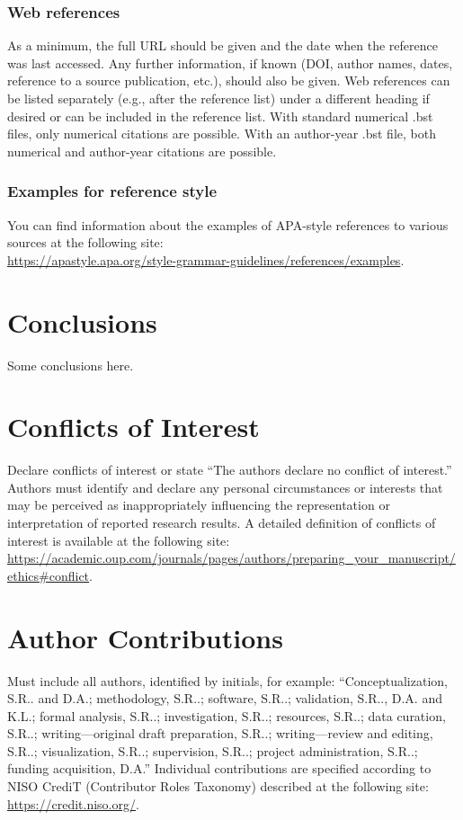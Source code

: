 \documentclass[12pt,a4paper]{article}
\begin{document}
\subsubsection{Web references}
As a minimum, the full URL should be given and the date when the reference was last accessed. Any further information, if known (DOI, author names, dates, reference to a source publication, etc.), should also be given. Web references can be listed separately (e.g., after the reference list) under a different heading if desired or can be included in the reference list. With standard numerical .bst files, only numerical citations are possible. With an author-year .bst file, both numerical and author-year citations are possible. 

\subsubsection{Examples for reference style}
You can find information about the examples of APA-style references to various sources at the following site:\\
\url{https://apastyle.apa.org/style-grammar-guidelines/references/examples}.


\section{Conclusions}
Some conclusions here.


\section*{Conflicts of Interest} 
Declare conflicts of interest or state “The authors declare no conflict of interest.” Authors must identify and declare any personal circumstances or interests that may be perceived as inappropriately influencing the representation or interpretation of reported research results. A detailed definition of conflicts of interest is available at the following site: \url{https://academic.oup.com/journals/pages/authors/preparing_your_manuscript/ethics#conflict}.

\section*{Author Contributions}
Must include all authors, identified by initials, for example: “Conceptualization, S.R.. and D.A.; methodology, S.R..; software, S.R..; validation, S.R.., D.A. and K.L.; formal analysis, S.R..; investigation, S.R..; resources, S.R..; data curation, S.R..; writing—original draft preparation, S.R..; writing—review and editing, S.R..; visualization, S.R..; supervision, S.R..; project administration, S.R..; funding acquisition, D.A.” Individual contributions are specified according to NISO CrediT (Contributor Roles Taxonomy) described at the following site: \url{https://credit.niso.org/}.
\end{document}
